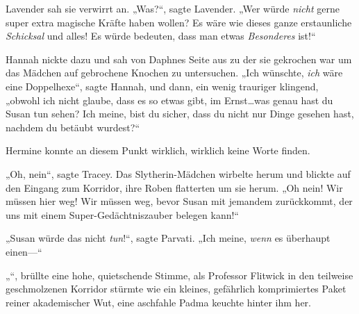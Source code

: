 Lavender sah sie verwirrt an. „Was?“, sagte Lavender. „Wer würde \emph{nicht} gerne super extra magische Kräfte haben wollen? Es wäre wie dieses ganze erstaunliche \emph{Schicksal} und alles! Es würde bedeuten, dass man etwas \emph{Besonderes} ist!“

Hannah nickte dazu und sah von Daphnes Seite aus zu der sie gekrochen war um das Mädchen auf gebrochene Knochen zu untersuchen. „Ich wünschte, \emph{ich} wäre eine Doppelhexe“, sagte Hannah, und dann, ein wenig trauriger klingend, „obwohl ich nicht glaube, dass es so etwas gibt, im Ernst…was genau hast du Susan tun sehen? Ich meine, bist du sicher, dass du nicht nur Dinge gesehen hast, nachdem du betäubt wurdest?“

Hermine konnte an diesem Punkt wirklich, wirklich keine Worte finden.

„Oh, nein“, sagte Tracey. Das Slytherin-Mädchen wirbelte herum und blickte auf den Eingang zum Korridor, ihre Roben flatterten um sie herum. „Oh nein! Wir müssen hier weg! Wir müssen weg, bevor Susan mit jemandem zurückkommt, der uns mit einem Super-Gedächtniszauber belegen kann!“

„Susan würde das nicht \emph{tun}!“, sagte Parvati. „Ich meine, \emph{wenn} es überhaupt einen—“

„“, brüllte eine hohe, quietschende Stimme, als Professor Flitwick in den teilweise geschmolzenen Korridor stürmte wie ein kleines, gefährlich komprimiertes Paket reiner akademischer Wut, eine aschfahle Padma keuchte hinter ihm her.

